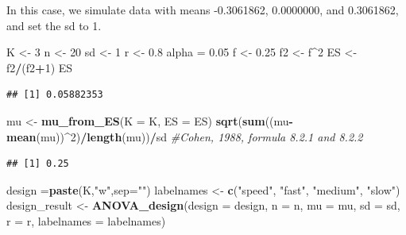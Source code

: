 \documentclass[]{book}
\newenvironment{Shaded}{\begin{snugshade}}{\end{snugshade}}
\newcommand{\CommentTok}[1]{\textcolor[rgb]{0.56,0.35,0.01}{\textit{#1}}}
\newcommand{\DataTypeTok}[1]{\textcolor[rgb]{0.13,0.29,0.53}{#1}}
\newcommand{\DecValTok}[1]{\textcolor[rgb]{0.00,0.00,0.81}{#1}}
\newcommand{\FloatTok}[1]{\textcolor[rgb]{0.00,0.00,0.81}{#1}}
\newcommand{\KeywordTok}[1]{\textcolor[rgb]{0.13,0.29,0.53}{\textbf{#1}}}
\newcommand{\NormalTok}[1]{#1}
\newcommand{\OperatorTok}[1]{\textcolor[rgb]{0.81,0.36,0.00}{\textbf{#1}}}
\newcommand{\StringTok}[1]{\textcolor[rgb]{0.31,0.60,0.02}{#1}}
\begin{document}
In this case, we simulate data with means -0.3061862, 0.0000000, and 0.3061862, and set the sd to 1.

\begin{Shaded}
\begin{Highlighting}[]
\NormalTok{K <-}\StringTok{ }\DecValTok{3}
\NormalTok{n <-}\StringTok{ }\DecValTok{20}
\NormalTok{sd <-}\StringTok{ }\DecValTok{1}
\NormalTok{r <-}\StringTok{ }\FloatTok{0.8}
\NormalTok{alpha =}\StringTok{ }\FloatTok{0.05}
\NormalTok{f <-}\StringTok{ }\FloatTok{0.25}
\NormalTok{f2 <-}\StringTok{ }\NormalTok{f}\OperatorTok{^}\DecValTok{2}
\NormalTok{ES <-}\StringTok{ }\NormalTok{f2}\OperatorTok{/}\NormalTok{(f2}\OperatorTok{+}\DecValTok{1}\NormalTok{)}
\NormalTok{ES}
\end{Highlighting}
\end{Shaded}

\begin{verbatim}
## [1] 0.05882353
\end{verbatim}

\begin{Shaded}
\begin{Highlighting}[]
\NormalTok{mu <-}\StringTok{ }\KeywordTok{mu_from_ES}\NormalTok{(}\DataTypeTok{K =}\NormalTok{ K, }\DataTypeTok{ES =}\NormalTok{ ES)}
\KeywordTok{sqrt}\NormalTok{(}\KeywordTok{sum}\NormalTok{((mu}\OperatorTok{-}\KeywordTok{mean}\NormalTok{(mu))}\OperatorTok{^}\DecValTok{2}\NormalTok{)}\OperatorTok{/}\KeywordTok{length}\NormalTok{(mu))}\OperatorTok{/}\NormalTok{sd }\CommentTok{#Cohen, 1988, formula 8.2.1 and 8.2.2}
\end{Highlighting}
\end{Shaded}

\begin{verbatim}
## [1] 0.25
\end{verbatim}

\begin{Shaded}
\begin{Highlighting}[]
\NormalTok{design =}\KeywordTok{paste}\NormalTok{(K,}\StringTok{"w"}\NormalTok{,}\DataTypeTok{sep=}\StringTok{""}\NormalTok{)}
\NormalTok{labelnames <-}\StringTok{ }\KeywordTok{c}\NormalTok{(}\StringTok{"speed"}\NormalTok{, }\StringTok{"fast"}\NormalTok{, }\StringTok{"medium"}\NormalTok{, }\StringTok{"slow"}\NormalTok{)}
\NormalTok{design_result <-}\StringTok{ }\KeywordTok{ANOVA_design}\NormalTok{(}\DataTypeTok{design =}\NormalTok{ design,}
                   \DataTypeTok{n =}\NormalTok{ n, }
                   \DataTypeTok{mu =}\NormalTok{ mu, }
                   \DataTypeTok{sd =}\NormalTok{ sd, }
                   \DataTypeTok{r =}\NormalTok{ r, }
                   \DataTypeTok{labelnames =}\NormalTok{ labelnames)}
\end{Highlighting}
\end{Shaded}
\end{document}

